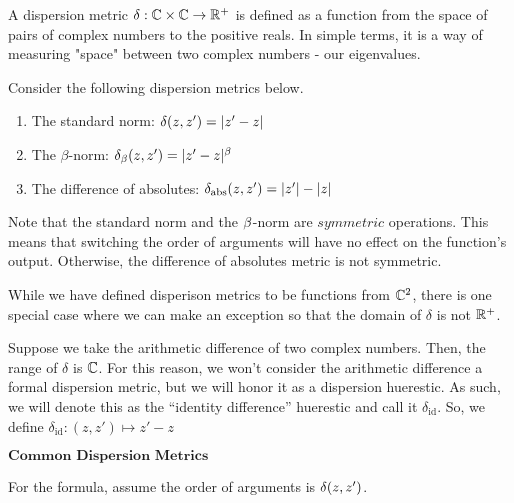 \begin{definition}
A dispersion metric $\delta: \mathbb{C} \times \mathbb{C} \to \mathbb{R}^+$ is defined as a function from the space of pairs of complex numbers to the positive reals. In simple terms, it is a way of measuring "space" between two complex numbers - our eigenvalues.
\end{definition}

Consider the following dispersion metrics below.

\begin{enumerate}
\item The standard norm: $\delta(z,z') = |z' - z|$
\item The $\beta$-norm: $\delta_\beta(z,z') = |z' - z|^\beta$
\item The difference of absolutes: $\delta_{\text{abs}}(z,z') = |z'| - |z|$
\end{enumerate}

\begin{remark}
Note that the standard norm and the $\beta$-norm are $\textit{symmetric}$ operations. This means that switching the order of arguments will have no effect on the function's output. Otherwise, the difference of absolutes metric is not symmetric.
\end{remark}

While we have defined disperison metrics to be functions from $\mathbb{C}^2$, there is one special case where we can make an exception so that the domain of $\delta$ is not $\mathbb{R}^+$. 

\begin{remark}
Suppose we take the arithmetic difference of two complex numbers. Then, the range of $\delta$ is $\mathbb{C}$. For this reason, we won't consider the arithmetic difference a formal dispersion metric, but we will honor it as a dispersion huerestic. As such, we will denote this as the ``identity difference'' huerestic and call it $\delta_{\text{id}}$. So, we define $\delta_{\text{id}}: (z, z') \mapsto z' - z$
\end{remark}

\begin{center}
$\textbf{Common Dispersion Metrics}$
\end{center}

For the formula, assume the order of arguments is $\delta(z, z')$. \newline

